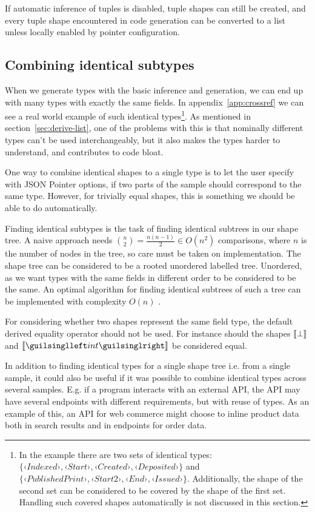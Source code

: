 If automatic inference of tuples is disabled, tuple shapes can still be created, and every tuple shape encountered in code generation can be converted to a list unless locally enabled by pointer configuration.

\subsection{Combining identical subtypes}

When we generate types with the basic inference and generation, we can end up with many types with exactly the same fields. In appendix~\ref{app:crossref} we can see a real world example of such identical types\footnote{In the example there are two sets of identical types: $\{‹Indexed›, ‹Start›, ‹Created›, ‹Deposited›\}$ and $\{‹PublishedPrint›, ‹Start2›, ‹End›, ‹Issued›\}$. Additionally, the shape of the second set can be considered to be covered by the shape of the first set. Handling such covered shapes automatically is not discussed in this section.}. As mentioned in section~\ref{sec:derive-list}, one of the problems with this is that nominally different types can't be used interchangeably, but it also makes the types harder to understand, and contributes to code bloat.

One way to combine identical shapes to a single type is to let the user specify with JSON Pointer options, if two parts of the sample should correspond to the same type. However, for trivially equal shapes, this is something we should be able to do automatically.

Finding identical subtypes is the task of finding identical subtrees in our shape tree. A naive approach needs $\binom{n}{2} = \frac{n(n-1)}{2} \in O(n^2)$ comparisons, where $n$ is the number of nodes in the tree, so care must be taken on implementation. The shape tree can be considered to be a rooted unordered labelled tree. Unordered, as we want types with the same fields in different order to be considered to be the same. An optimal algorithm for finding identical subtrees of such a tree can be implemented with complexity $O(n)$ \cite{subtree-repeats}.

For considering whether two shapes represent the same field type, the default derived equality operator should not be used. For instance should the shapes $\llbracket \bot \rrbracket$ and $\vect{‹int›}$ be considered equal.

In addition to finding identical types for a single shape tree i.e. from a single sample, it could also be useful if it was possible to combine identical types across several samples. E.g. if a program interacts with an external API, the API may have several endpoints with different requirements, but with reuse of types. As an example of this, an API for web commerce might choose to inline product data both in search results and in endpoints for order data.

